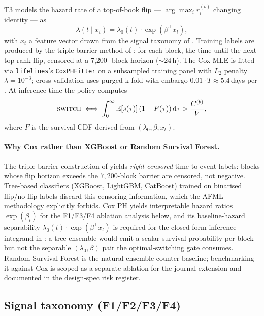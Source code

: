 T3 models the hazard rate of a top-of-book flip ---
$\arg\max_i r_i^{(b)}$ changing identity --- as
\begin{equation}
\label{eq:t3}
\lambda(t \mid x_t) = \lambda_0(t) \cdot \exp(\beta^{\top} x_t),
\end{equation}
with $x_t$ a feature vector drawn from the signal taxonomy of
.  Training labels are produced by the
triple-barrier method of \cite[Ch.\,3.6]{lopezdeprado2018}: for each
block, the time until the next top-rank flip, censored at a 7{,}200-
block horizon ($\sim 24$\,h).  The Cox MLE is fitted via
\texttt{lifelines}'s \texttt{CoxPHFitter} on a subsampled training
panel with $L_2$ penalty $\lambda = 10^{-3}$; cross-validation uses
purged k-fold with embargo $0.01 \cdot T \approx 5.4$\,days per
\cite[Ch.\,7]{lopezdeprado2018}.  At inference time the policy
computes
\begin{equation}
\label{eq:t3-decide}
\textsc{switch} \iff
  \int_0^{\infty} \mathbb{E}[s(\tau)]\,
                  (1 - F(\tau))\,\mathrm{d}\tau
  > \frac{C^{(b)}}{V},
\end{equation}
where $F$ is the survival CDF derived from
$(\lambda_0, \beta, x_t)$.

\paragraph{Why Cox rather than XGBoost or Random Survival Forest.}
The triple-barrier construction of \cite[Ch.\,3.6]{lopezdeprado2018}
yields \emph{right-censored} time-to-event labels: blocks whose flip
horizon exceeds the $7{,}200$-block barrier are censored, not
negative.  Tree-based classifiers (XGBoost, LightGBM, CatBoost)
trained on binarised flip/no-flip labels discard this censoring
information, which the AFML methodology explicitly forbids.  Cox PH
yields interpretable hazard ratios $\exp(\beta_i)$ for the
F1/F3/F4 ablation analysis below, and its baseline-hazard
separability $\lambda_0(t)\cdot\exp(\beta^{\top} x_t)$ is required
for the closed-form inference integrand in
: a tree ensemble would emit a scalar survival
probability per block but not the separable $(\lambda_0, \beta)$
pair the optimal-switching gate consumes.  Random Survival Forest
is the natural ensemble counter-baseline; benchmarking it against
Cox is scoped as a separate ablation for the journal extension and
documented in the design-spec risk register.

\subsection{Signal taxonomy (F1/F2/F3/F4)}
\label{sec:methodology-signals}

